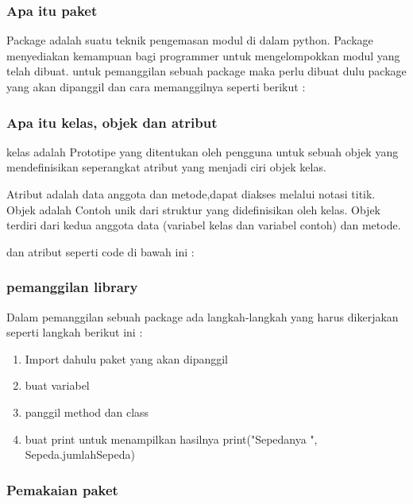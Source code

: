 \subsubsection{Apa itu paket}
Package adalah suatu teknik pengemasan modul di dalam python. Package menyediakan kemampuan bagi programmer untuk mengelompokkan modul yang telah dibuat. untuk pemanggilan sebuah package maka perlu dibuat dulu package yang akan dipanggil dan cara memanggilnya seperti berikut :


\subsubsection{Apa itu kelas, objek dan atribut}
kelas adalah Prototipe yang ditentukan oleh pengguna untuk sebuah objek yang mendefinisikan seperangkat atribut yang menjadi ciri objek kelas.

Atribut adalah data anggota dan metode,dapat diakses melalui notasi titik.
Objek adalah Contoh unik dari struktur yang didefinisikan oleh kelas.
Objek terdiri dari kedua anggota data (variabel kelas dan variabel contoh) dan metode.

dan atribut seperti code di bawah ini :

\subsubsection{pemanggilan library}
Dalam pemanggilan sebuah package ada langkah-langkah yang harus dikerjakan seperti langkah berikut ini :
\begin{enumerate}
	\item Import dahulu paket yang akan dipanggil
	\item buat variabel
	\item panggil method dan class
	\item buat print untuk menampilkan hasilnya
	print("Sepedanya ", Sepeda.jumlahSepeda)
	
\end{enumerate}
\subsubsection{Pemakaian paket}

